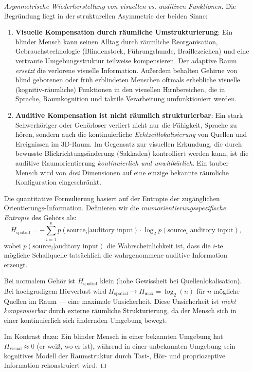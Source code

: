 ﻿\documentclass[12pt, a4paper]{article}
\theoremstyle{definition}
\theoremstyle{remark}
\begin{document}
\begin{proof}[Asymmetrische Wiederherstellung von visuellen vs. auditiven Funktionen]
Die Begründung liegt in der strukturellen Asymmetrie der beiden Sinne:

\begin{enumerate}

\item \textbf{Visuelle Kompensation durch räumliche Umstrukturierung}:
Ein blinder Mensch kann seinen Alltag durch räumliche Reorganisation, Gebrauchstechnologie (Blindenstock, Führungshunde, Braillezeichen) und eine vertraute Umgebungsstruktur teilweise kompensieren. Der adaptive Raum \emph{ersetzt} die verlorene visuelle Information. Außerdem behalten Gehirne von blind geborenen oder früh erblindeten Menschen oftmals erhebliche visuelle (kognitiv-räumliche) Funktionen in den visuellen Hirnbereichen, die in Sprache, Raumkognition und taktile Verarbeitung umfunktioniert werden.

\item \textbf{Auditive Kompensation ist nicht räumlich strukturierbar}:
Ein stark Schwerhöriger oder Gehörloser verliert nicht nur die Fähigkeit, Sprache zu hören, sondern auch die kontinuierliche \emph{Echtzeitlokalisierung} von Quellen und Ereignissen im 3D-Raum. Im Gegensatz zur visuellen Erkundung, die durch bewusste Blickrichtungsänderung (Sakkaden) kontrolliert werden kann, ist die auditive Raumorientierung \emph{kontinuierlich und unwillkürlich}. Ein tauber Mensch wird von \emph{drei} Dimensionen auf eine einzige bekannte räumliche Konfiguration eingeschränkt.

\end{enumerate}

Die quantitative Formulierung basiert auf der Entropie der zugänglichen Orientierungs-Information. Definieren wir die \emph{raumorientierungsspezifische Entropie} des Gehörs als:
\begin{equation}
H_{\text{spatial}} = -\sum_{i=1}^{n} p(\text{source}_i | \text{auditory input}) \cdot \log_2 p(\text{source}_i | \text{auditory input}),
\label{eq:entropy_spatial}
\end{equation}
wobei $p(\text{source}_i | \text{auditory input})$ die Wahrscheinlichkeit ist, dass die $i$-te mögliche Schallquelle tatsächlich die wahrgenommene auditive Information erzeugt.

Bei normalem Gehör ist $H_{\text{spatial}}$ klein (hohe Gewissheit bei Quellenlokalisation). Bei hochgradigem Hörverlust wird $H_{\text{spatial}} \to H_{\text{max}} = \log_2(n)$ für $n$ mögliche Quellen im Raum --- eine maximale Unsicherheit. Diese Unsicherheit ist \emph{nicht kompensierbar} durch externe räumliche Strukturierung, da der Mensch sich in einer kontinuierlich sich ändernden Umgebung bewegt.

Im Kontrast dazu: Ein blinder Mensch in einer bekannten Umgebung hat $H_{\text{visual}} \approx 0$ (er weiß, wo er ist), während in einer unbekannten Umgebung sein kognitives Modell der Raumstruktur durch Tast-, Hör- und propriozeptive Information rekonstruiert wird.

\end{proof}
\end{document}

